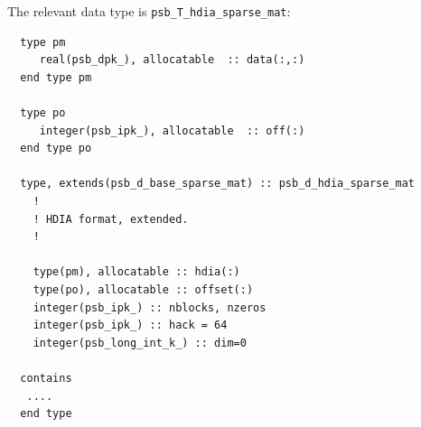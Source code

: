 The relevant data type is \verb|psb_T_hdia_sparse_mat|:
\begin{verbatim}
  type pm
     real(psb_dpk_), allocatable  :: data(:,:)
  end type pm

  type po
     integer(psb_ipk_), allocatable  :: off(:)
  end type po

  type, extends(psb_d_base_sparse_mat) :: psb_d_hdia_sparse_mat
    !
    ! HDIA format, extended.
    !
    
    type(pm), allocatable :: hdia(:)
    type(po), allocatable :: offset(:)
    integer(psb_ipk_) :: nblocks, nzeros
    integer(psb_ipk_) :: hack = 64
    integer(psb_long_int_k_) :: dim=0

  contains
   ....
  end type
\end{verbatim}



